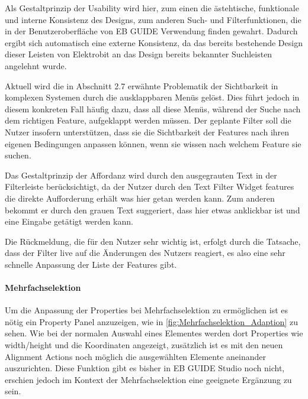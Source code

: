 Als Gestaltprinzip der Usability wird hier, zum einen die ästehtische, funktionale und interne Konsistenz des Designs, zum anderen Such- und Filterfunktionen, die in der Benutzeroberfläche von EB GUIDE Verwendung finden gewahrt.
Dadurch ergibt sich automatisch eine externe Konsistenz, da das bereits bestehende Design dieser Leisten von Elektrobit an das Design bereits bekannter Suchleisten angelehnt wurde.

Aktuell wird die in Abschnitt 2.7 erwähnte Problematik der Sichtbarkeit in komplexen Systemen durch die ausklappbaren Menüs gelöst.
Dies führt jedoch in diesem konkreten Fall häufig dazu, dass all diese Menüs, während der Suche nach dem richtigen Feature, aufgeklappt werden müssen.
Der geplante Filter soll die Nutzer insofern unterstützen, dass sie die Sichtbarkeit der Features nach ihren eigenen Bedingungen anpassen können, wenn sie wissen nach welchem Feature sie suchen.

Das Gestaltprinzip der Affordanz wird durch den ausgegrauten Text in der Filterleiste berücksichtigt, da der Nutzer durch den Text \glqq Filter Widget features\grqq{} die direkte Aufforderung erhält was hier getan werden kann.
Zum anderen bekommt er durch den grauen Text suggeriert, dass hier etwas anklickbar ist und eine Eingabe getätigt werden kann.

Die Rückmeldung, die für den Nutzer sehr wichtig ist, erfolgt durch die Tatsache, dass der Filter live auf die Änderungen des Nutzers reagiert, es also eine sehr schnelle Anpassung der Liste der Features gibt.

\paragraph{Mehrfachselektion}
Um die Anpassung der Properties bei Mehrfachselektion zu ermöglichen ist es nötig ein Property Panel anzuzeigen, wie in \cref{fig:Mehrfachselektion_Adaption} zu sehen.
Wie bei der normalen Auswahl eines Elementes werden dort Properties wie width/height und die Koordinaten angezeigt, zusätzlich ist es mit den neuen Alignment Actions noch möglich die ausgewählten Elemente aneinander auszurichten.
Diese Funktion gibt es bisher in EB GUIDE Studio noch nicht, erschien jedoch im Kontext der Mehrfachselektion eine geeignete Ergänzung zu sein.

